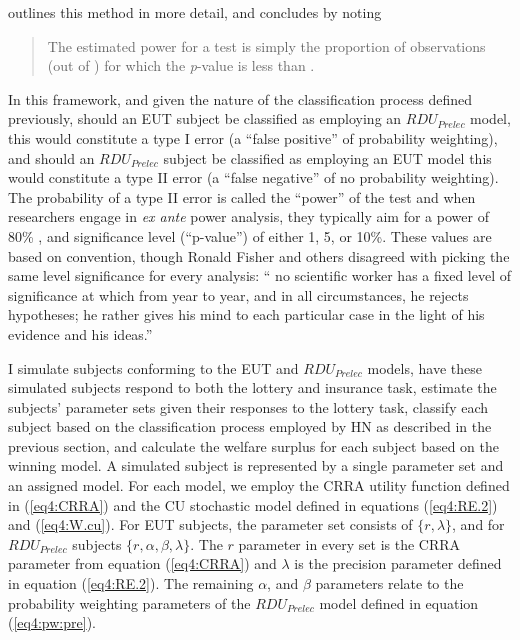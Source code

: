 \documentclass[../main.tex]{subfiles}
\begin{document}
\textcite[109]{Feiveson2002} outlines this method in more detail, and concludes by noting 
\blockquote{
	The estimated power for a  test is simply the proportion of observations (out of ) for which the \textit{p}-value is less than .
}

In this framework, and given the nature of the classification process defined previously, should an EUT subject be classified as employing an $\mathit{RDU_{Prelec}}$ model, this would constitute a type I error (a \enquote{false positive} of probability weighting), and should an $\mathit{RDU_{Prelec}}$ subject be classified as employing an EUT model this would constitute a type II error (a \enquote{false negative} of no probability weighting).
The probability of a type II error is called the \enquote{power} of the test and when researchers engage in \textit{ex ante} power analysis, they typically aim for a power of 80\% \parencite{Cohen1988, Gelman2014}, and significance level (\enquote{p-value}) of either 1, 5, or 10\%.
These values are based on convention, though Ronald Fisher and others disagreed with picking the same level significance for every analysis: \enquote{\textelp{} no scientific worker has a fixed level of significance at which from year to year, and in all circumstances, he rejects hypotheses; he rather gives his mind to each particular case in the light of his evidence and his ideas.} \parencite{Fisher1956}

I simulate subjects conforming to the EUT and $\mathit{RDU_{Prelec}}$ models, have these simulated subjects respond to both the lottery and insurance task, estimate the subjects' parameter sets given their responses to the lottery task, classify each subject based on the classification process employed by HN as described in the previous section, and calculate the welfare surplus for each subject based on the winning model.{\footnotemark}
A simulated subject is represented by a single parameter set and an assigned model.
For each model, we employ the CRRA utility function defined in (\ref{eq4:CRRA}) and the CU stochastic model defined in equations (\ref{eq4:RE.2}) and (\ref{eq4:W.cu}).
For EUT subjects, the parameter set consists of $\lbrace r, \lambda \rbrace$, and for $\mathit{RDU_{Prelec}}$ subjects $\lbrace r, \alpha, \beta, \lambda \rbrace$.
The $r$ parameter in every set is the CRRA parameter from equation (\ref{eq4:CRRA}) and $\lambda$ is the precision parameter defined in equation (\ref{eq4:RE.2}).
The remaining $\alpha$, and $\beta$ parameters relate to the probability weighting parameters of the $\mathit{RDU_{Prelec}}$ model defined in equation (\ref{eq4:pw:pre}).
\end{document}
